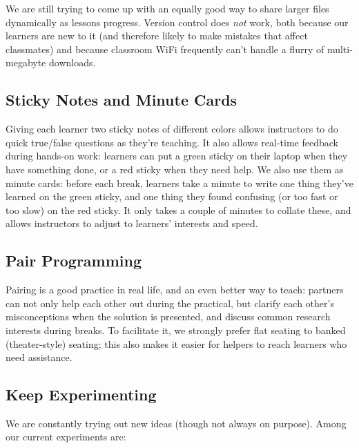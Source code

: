 \documentclass[10pt,a4paper,twocolumn]{article}
\begin{document}
We are still trying to come up with an equally good way to share larger
files dynamically as lessons progress.  Version control does \emph{not}
work, both because our learners are new to it (and therefore likely to
make mistakes that affect classmates) and because classroom WiFi
frequently can't handle a flurry of multi-megabyte downloads.

\subsection*{Sticky Notes and Minute Cards}

Giving each learner two sticky notes of different colors allows
instructors to do quick true/false questions as they're teaching. It
also allows real-time feedback during hands-on work: learners can put a
green sticky on their laptop when they have something done, or a red
sticky when they need help. We also use them as minute cards: before
each break, learners take a minute to write one thing they've learned on
the green sticky, and one thing they found confusing (or too fast or too
slow) on the red sticky. It only takes a couple of minutes to collate
these, and allows instructors to adjust to learners' interests and
speed.

\subsection*{Pair Programming}

Pairing is a good practice in real life, and an even better way to
teach: partners can not only help each other out during the practical,
but clarify each other's misconceptions when the solution is presented,
and discuss common research interests during breaks. To facilitate it,
we strongly prefer flat seating to banked (theater-style) seating; this
also makes it easier for helpers to reach learners who need assistance.

\subsection*{Keep Experimenting}

We are constantly trying out new ideas (though not always on purpose).
Among our current experiments are:
\end{document}

